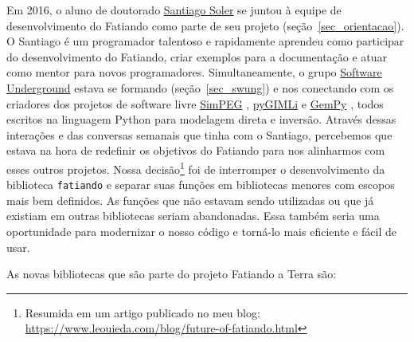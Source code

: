 \documentclass[10pt,a4paper,oneside]{book}
\begin{document}
Em 2016, o aluno de doutorado \href{https://www.santisoler.com/}{Santiago
Soler} se juntou à equipe de desenvolvimento do Fatiando como parte de seu
projeto (seção~\ref{sec_orientacao}).
O Santiago é um programador talentoso e rapidamente aprendeu como participar
do desenvolvimento do Fatiando, criar exemplos para a documentação e atuar como
mentor para novos programadores.
Simultaneamente, o grupo
\href{https://softwareunderground.org/}{Software Underground} estava se
formando (seção~\ref{sec_swung}) e nos conectando com os criadores dos projetos
de software livre
\href{https://simpeg.xyz/}{SimPEG} \citep{Cockett2015},
\href{https://www.pygimli.org}{pyGIMLi} \citep{Rucker2017} e
\href{https://www.gempy.org/}{GemPy} \citep{delaVarga2019},
todos escritos na linguagem Python para modelagem direta e inversão.
Através dessas interações e das conversas semanais que tinha com o Santiago,
percebemos que estava na hora de redefinir os objetivos do Fatiando para
nos alinharmos com esses outros projetos.
Nossa decisão\footnote{Resumida em um artigo publicado no meu blog:
\url{https://www.leouieda.com/blog/future-of-fatiando.html}} foi de
interromper o desenvolvimento da biblioteca \texttt{fatiando} e separar suas
funções em bibliotecas menores com escopos mais bem definidos.
As funções que não estavam sendo utilizadas ou que já existiam em outras
bibliotecas seriam abandonadas.
Essa também seria uma oportunidade para modernizar o nosso código e torná-lo
mais eficiente e fácil de usar.

As novas bibliotecas que são parte do projeto Fatiando a Terra são:
\end{document}
